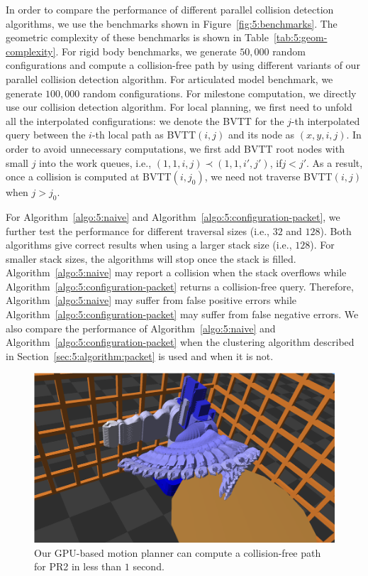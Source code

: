In order to compare the performance of different parallel collision detection algorithms, we use the benchmarks shown
in Figure~\ref{fig:5:benchmarks}. The geometric complexity of these benchmarks is shown in  Table~\ref{tab:5:geom-complexity}.
For rigid body benchmarks, we generate $50,000$ random configurations and compute a collision-free path by using different
variants of our parallel collision detection algorithm. For articulated model benchmark, we generate $100,000$
random configurations. For milestone computation, we directly use our collision
detection algorithm. For local planning, we first need to unfold all the interpolated configurations: we denote the
BVTT for the $j$-th interpolated query between the $i$-th local path as BVTT$(i,j)$ and its node as $(x,y,i,j)$.
In order to avoid unnecessary computations, we first add BVTT root nodes with small $j$ into the work queues,
i.e., $(1,1,i,j) \prec (1,1,i',j')$, if$j < j'$. As a result, once a collision is computed at BVTT$(i, j_0)$,
we need not traverse BVTT$(i, j)$ when $j > j_0$.

For Algorithm~\ref{algo:5:naive} and Algorithm~\ref{algo:5:configuration-packet}, we further test the performance for
different traversal sizes (i.e., $32$ and $128$). Both algorithms give correct results when using a larger stack size (i.e.,
$128$). For smaller stack sizes, the algorithms will stop once the stack is filled.
Algorithm~\ref{algo:5:naive} may report a collision when the stack overflows while Algorithm~\ref{algo:5:configuration-packet}
returns a collision-free query. Therefore, Algorithm~\ref{algo:5:naive} may suffer from false positive errors while Algorithm~\ref{algo:5:configuration-packet}
may suffer from false negative errors. We also
compare the performance of Algorithm~\ref{algo:5:naive} and Algorithm~\ref{algo:5:configuration-packet} when the clustering algorithm described in Section~\ref{sec:5:algorithm:packet} is used and when it is not.

\begin{figure}[htb]
  \centering
  \includegraphics[width=\linewidth]{figs/5/pr2_result.png}
  \caption[The GPU-based motion planner can compute a collision-free path for PR2 in less than $1$ second]{Our GPU-based motion planner can compute a collision-free path for PR2 in less than $1$ second. }
  \label{fig:5:PR2result}
\end{figure}


